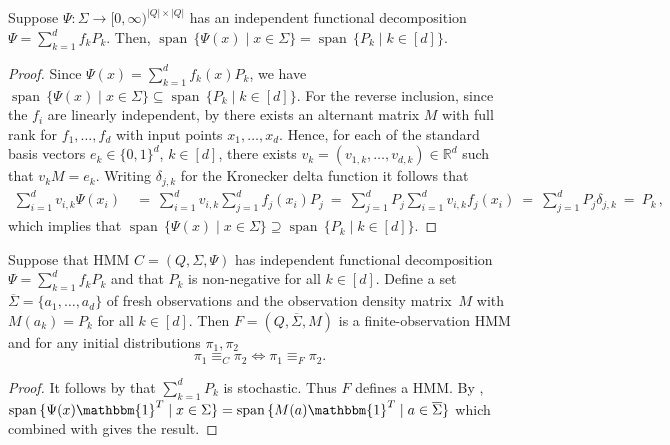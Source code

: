 \documentclass[a4paper,UKenglish,cleveref, autoref,mathscr]{lipics-v2019}
\newcommand{\RR}{\mathbb{R}}
\newcommand{\1}{\mathbbm{1}}
\DeclareMathOperator{\Span}{span\,}
\begin{document}
\begin{lemma}\label{spanpreserving}
Suppose $\Psi : \Sigma \rightarrow [0,\infty)^{|Q| \times |Q|}$ has an independent functional decomposition $\Psi = \sum_{k = 1}^d f_k P_k$. Then, $\Span \{\Psi(x) \mid x \in \Sigma\} = \Span \{P_k \mid k \in [d]\}.$
\end{lemma}
\begin{proof}
Since $\Psi(x) = \sum_{k = 1}^d f_k(x) P_k$, we have $\Span \{\Psi(x) \mid x \in \Sigma\} \subseteq \Span \{P_k \mid k \in [d]\}$. For the reverse inclusion, since the $f_i$ are linearly independent, by  there exists an alternant matrix $M$ with full rank for $f_1, \dots, f_d$ with input points $x_1, \dots, x_d$.
Hence, for each of the standard basis vectors $e_k \in \{0,1\}^d$, $k \in [d]$, there exists $v_k = (v_{1,k} ,\dots, v_{d,k}) \in \RR^d$ such that $v_k M = e_k$. Writing $\delta_{j,k}$ for the Kronecker delta function it follows that
\begin{equation*}
\begin{split}
\sum_{i = 1}^d v_{i,k} \Psi(x_i) & \ = \ \sum_{i = 1}^d v_{i,k} \sum_{j = 1}^d f_j(x_i) P_j
 \ = \ \sum_{j = 1}^d P_j \sum_{i = 1}^d v_{i,k} f_j(x_i)
 \ = \ \sum_{j = 1}^d P_j \delta_{j,k}
 \ = \ P_k\,,
\end{split}
\end{equation*}
which implies that $\Span \{\Psi(x) \mid x \in \Sigma\} \supseteq \Span \{P_k \mid k \in [d]\}.$
\end{proof}




\begin{proposition}\label{nonnegreduction}
Suppose that HMM $C = (Q, \Sigma, \Psi)$ has independent functional decomposition $\Psi = \sum_{k = 1}^d f_k P_k$ and that $P_k$ is non-negative for all $k \in [d]$. Define a set $\overline{\Sigma} = \{ a_1, \dots, a_d \}$ of fresh observations and the observation density matrix~$M$ with
$M(a_k) = P_k$ for all $k \in [d]$. Then $F = (Q, \overline{\Sigma}, M)$ is a finite-observation HMM and for any initial distributions $\pi_1, \pi_2$
\[\pi_1 \equiv_C \pi_2 \iff \pi_1 \equiv_F \pi_2. \]
\end{proposition}

\begin{proof}
It follows by  that $\sum_{k = 1}^d P_k$ is stochastic. Thus $F$ defines a HMM. By ,  $\Span \{\Psi(x)\1^T \mid x \in \Sigma\} = \Span \{M(a)\1^T \mid a \in \overline{\Sigma}\}$ which combined with  gives the result.
\end{proof}
\end{document}
